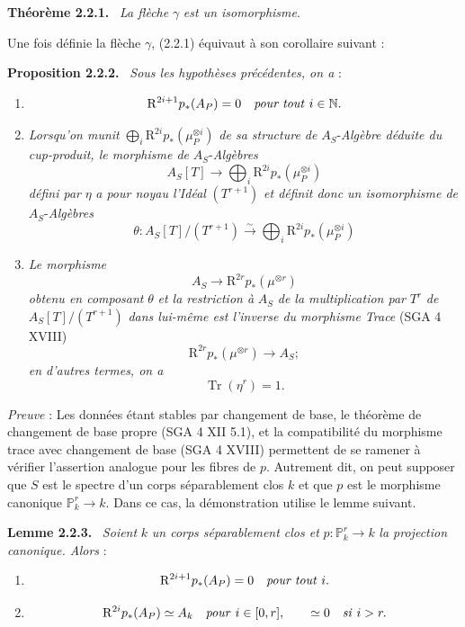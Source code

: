 \documentclass[11pt]{article}
\newenvironment{statement}[1]{\par\medskip\noindent\textbf{#1.}\ }{\par\medskip}
\begin{document}
\begin{statement}{Théorème 2.2.1}
\emph{La flèche} $\gamma$ \emph{est un isomorphisme}.
\end{statement}

Une fois définie la flèche $\gamma$, (2.2.1) équivaut à son corollaire suivant :

\begin{statement}{Proposition 2.2.2}
\emph{Sous les hypothèses précédentes, on a} :
\begin{enumerate}[label=\alph*)]
\item
\[
\mathrm{R}^{2i+1}p_*(A_P)=0\quad\text{\emph{pour tout} }i\in\mathbb N.
\]
\item \emph{Lorsqu'on munit} $\bigoplus_i \mathrm{R}^{2i}p_*(\mu_P^{\otimes i})$ \emph{de sa structure de} $A_S$-\emph{Algèbre déduite du cup-produit, le morphisme de} $A_S$-\emph{Algèbres}
\[
A_S[T]\longrightarrow \bigoplus_i \mathrm{R}^{2i}p_*(\mu_P^{\otimes i})
\]
\emph{défini par} $\eta$ \emph{a pour noyau l'Idéal} $(T^{r+1})$ \emph{et définit donc un isomorphisme de} $A_S$-\emph{Algèbres}
\[
\theta:A_S[T]/(T^{r+1})\xrightarrow{\sim}\bigoplus_i \mathrm{R}^{2i}p_*(\mu_P^{\otimes i})
\]
\item \emph{Le morphisme}
\[
A_S\longrightarrow \mathrm{R}^{2r}p_*(\mu^{\otimes r})
\]
\emph{obtenu en composant} $\theta$ \emph{et la restriction à} $A_S$ \emph{de la multiplication par} $T^r$ \emph{de} $A_S[T]/(T^{r+1})$ \emph{dans lui-même est l'inverse du morphisme Trace} (SGA 4 XVIII)
\[
\mathrm{R}^{2r}p_*(\mu^{\otimes r})\longrightarrow A_S;
\]
\emph{en d'autres termes, on a}
\[
\operatorname{Tr}(\eta^r)=1.
\]
\end{enumerate}
\end{statement}

\emph{Preuve} : Les données étant stables par changement de base, le théorème de changement de base propre (SGA 4 XII 5.1), et la compatibilité du morphisme trace avec changement de base (SGA 4 XVIII) permettent de se ramener à vérifier l'assertion analogue pour les fibres de $p$. Autrement dit, on peut supposer que $S$ est le spectre d'un corps séparablement clos $k$ et que $p$ est le morphisme canonique $\mathbb P^r_k\to k$. Dans ce cas, la démonstration utilise le lemme suivant.

\begin{statement}{Lemme 2.2.3}
\emph{Soient} $k$ \emph{un corps séparablement clos et} $p:\mathbb P_k^r\to k$ \emph{la projection canonique. Alors} :
\begin{enumerate}[label=\alph*)]
\item
\[
\mathrm{R}^{2i+1}p_*(A_P)=0\quad\text{\emph{pour tout} }i.
\]
\item
\[
\mathrm{R}^{2i}p_*(A_P)\simeq A_k\quad\text{\emph{pour} }i\in[0,r],
\qquad
\simeq 0\quad\text{\emph{si} }i>r.
\]
\end{enumerate}
\end{statement}
\end{document}
